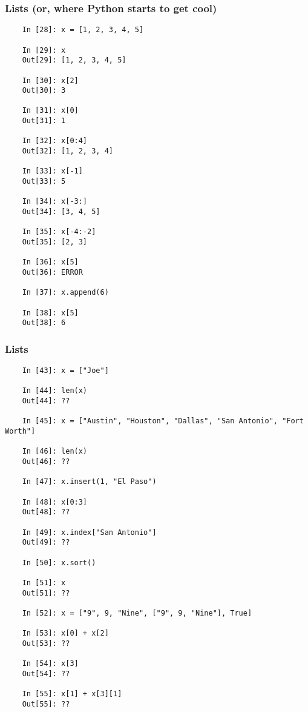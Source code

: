 \documentclass{beamer}
\begin{document}
\begin{frame}[fragile]
\frametitle{Lists (or, where Python starts to get cool)}
\begin{lstlisting}
	In [28]: x = [1, 2, 3, 4, 5]

	In [29]: x
	Out[29]: [1, 2, 3, 4, 5] 

	In [30]: x[2]
	Out[30]: 3

	In [31]: x[0]
	Out[31]: 1 

	In [32]: x[0:4]
	Out[32]: [1, 2, 3, 4] 

	In [33]: x[-1]
	Out[33]: 5 

	In [34]: x[-3:]
	Out[34]: [3, 4, 5] 

	In [35]: x[-4:-2]
	Out[35]: [2, 3]

	In [36]: x[5]
	Out[36]: ERROR 

	In [37]: x.append(6)
	
	In [38]: x[5]
	Out[38]: 6 
\end{lstlisting}
\end{frame}

\begin{frame}[fragile]
\frametitle{Lists}
\begin{lstlisting}
	In [43]: x = ["Joe"]
	
	In [44]: len(x)
	Out[44]: ??

	In [45]: x = ["Austin", "Houston", "Dallas", "San Antonio", "Fort Worth"]

	In [46]: len(x)
	Out[46]: ??

	In [47]: x.insert(1, "El Paso")

	In [48]: x[0:3]
	Out[48]: ?? 

	In [49]: x.index["San Antonio"]
	Out[49]: ??

	In [50]: x.sort()

	In [51]: x
	Out[51]: ??

	In [52]: x = ["9", 9, "Nine", ["9", 9, "Nine"], True]

	In [53]: x[0] + x[2]
	Out[53]: ??

	In [54]: x[3]
	Out[54]: ??

	In [55]: x[1] + x[3][1]
	Out[55]: ??
\end{lstlisting}
\end{frame}
\end{document}
